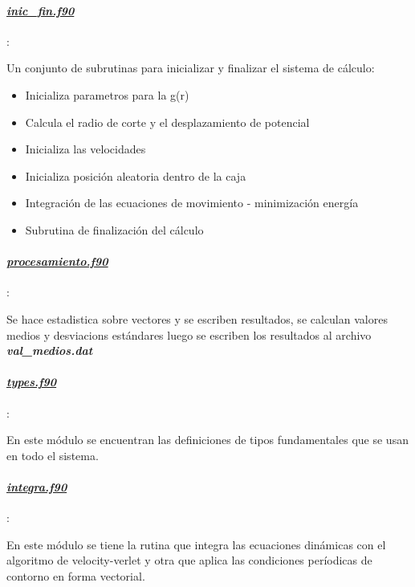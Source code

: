 \paragraph{\underline{\textit{inic\_fin.f90}}}:

Un conjunto de subrutinas para inicializar y finalizar el sistema de cálculo:

\begin{itemize}
  \item  Inicializa parametros para la g(r)
  \item  Calcula el radio de corte y el desplazamiento de potencial

  \item Inicializa las velocidades

  \item Inicializa posición aleatoria dentro de la caja

  \item Integración de las ecuaciones de movimiento - minimización energía

  \item Subrutina de finalización  del cálculo
\end{itemize}

\paragraph{\underline{\textit{procesamiento.f90}}}:

 Se hace estadistica sobre vectores y se escriben  resultados, se calculan 
 valores medios y desviacions estándares
 luego  se escriben los resultados al archivo \textbf{\textit{val\_medios.dat}}

\paragraph{\underline{\textit{types.f90}}}:

En este módulo se encuentran las definiciones de tipos fundamentales que se usan 
en todo el sistema.

\paragraph{\underline{\textit{integra.f90}}}:

 En este módulo se tiene la rutina que  integra las ecuaciones dinámicas 
 con el algoritmo de velocity-verlet y otra que aplica las condiciones períodicas 
 de contorno en forma vectorial.

